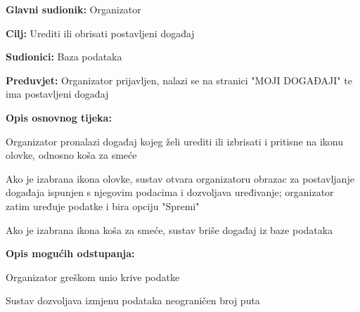 					\noindent {}
\begin{packed_item}
	\item \textbf{Glavni sudionik:} Organizator
	\item  \textbf{Cilj:} Urediti ili obrisati postavljeni događaj
	\item  \textbf{Sudionici:} Baza podataka
	\item  \textbf{Preduvjet:} Organizator prijavljen, nalazi se na stranici "MOJI DOGAĐAJI" te ima postavljeni događaj
	\item  \textbf{Opis osnovnog tijeka:}
	
	\item[] \begin{packed_enum}
		
		\item Organizator pronalazi događaj kojeg želi urediti ili izbrisati i pritisne na ikonu olovke, odnosno koša za smeće
		\item Ako je izabrana ikona olovke, sustav otvara organizatoru obrazac za postavljanje događaja ispunjen s njegovim podacima i dozvoljava uređivanje; organizator zatim uređuje podatke i bira opciju "Spremi"
		\item Ako je izabrana ikona koša za smeće, sustav briše događaj iz baze podataka
	\end{packed_enum}
	
	\item  \textbf{Opis mogućih odstupanja:}
	
	\item[] \begin{packed_item}
		
		\item[2.a] Organizator greškom unio krive podatke
		\item[] \begin{packed_enum}
			
			\item Sustav dozvoljava izmjenu podataka neograničen broj puta
			
		\end{packed_enum}
	\end{packed_item}
\end{packed_item}



